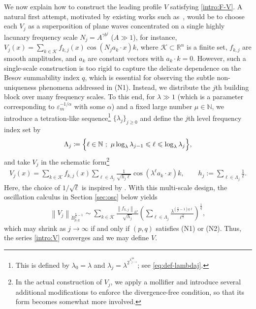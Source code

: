 \documentclass[a4paper,12pt,reqno]{amsart}
\theoremstyle{plain}
\theoremstyle{definition}
\newcommand{\dB}{\dot{B}}
\renewcommand{\leq}{\leqslant}
\renewcommand{\geq}{\geqslant}
\newcommand{\n}[1]{{\left\|#1\right\|}}
\newcommand{\N}{\mathbb{N}}
\renewcommand{\sp}[1]{\left(#1\right)}
\begin{document}
We now explain how to construct the leading profile $V$ satisfying \eqref{intro:F-V}.
A natural first attempt, motivated by existing works such as~\cite{Coi-Pal-25}, would be to choose each $V_j$
as a superposition of plane waves concentrated on a single highly lacunary frequency scale
$N_j = A^{\gamma b^j}$ ($A \gg 1$), for instance,
$V_j(x)=\sum_{k\in\mathcal{K}} f_{k,j}(x)\cos(N_j a_k\cdot x)k$,
where $\mathcal{K}\subset\mathbb{R}^n$ is a finite set, $f_{k,j}$ are smooth amplitudes, and $a_k$ are constant vectors with $a_k \cdot k = 0$.
However, such a single-scale construction is too rigid to capture the delicate dependence on the Besov summability index $q$, which is essential for observing the subtle non-uniqueness phenomena addressed in (N1).
Instead, we distribute the $j$th building block over many frequency scales.
To this end, for $\lambda\gg1$ (which is a parameter corresponding to $\varepsilon_m^{-1/\alpha}$ with some $\alpha$) and a fixed large number $\mu \in \N$, we introduce a tetration-like sequence\footnote{This is defined by $\lambda_0=\lambda$ and $\lambda_j=\lambda^{2^{\lambda_{j-1}^{4\mu}}}$; see \eqref{eq:def-lambdaj}.}
$\{\lambda_j\}_{j\geq 0}$
and define the $j$th level frequency index set by
\[
  \Lambda_j \coloneqq \Bigl\{\ell\in\mathbb{N}\ ;\ \mu\log_{\lambda}\lambda_{j-1}\leq \ell \leq \log_{\lambda}\lambda_j\Bigr\},
\]
and take $V_j$ in the schematic form\footnote{In the actual construction of $V_j$, we apply a mollifier and introduce several additional modifications to enforce the divergence-free condition, so that its form becomes somewhat more involved.}
\begin{align}
    V_j(x)
    = 
    \sum_{k\in\mathcal{K}} 
    f_{k,j}(x)
    \sum_{\ell\in\Lambda_j}\frac{1}{\sqrt{h_j\ell}}\cos \sp{\lambda^{\ell} a_k\cdot x}k,
    \qquad
    h_j
    :=
    \sum_{\ell \in \Lambda_j}\frac{1}{\ell}.
\end{align}
Here, the choice of $1/\sqrt{\ell}$ is inspired by \cites{Yon-10,Tsu-19-ARMA}.
With this multi-scale design, 
the oscillation calculus in Section \ref{sec:osc} below yields 
\begin{align}
    \n{V_j}_{\dB_{p,q}^{\frac{n}{p}-1}}
    \sim 
    \sum_{k \in \mathcal{K}}
    \frac{\n{f_{k,j}}_{L^p}}{\sqrt{h_j}}
    \sp{
    \sum_{\ell \in \Lambda_j}
    \frac{\lambda^{(\frac{n}{p}-1)q\ell}}{\ell^{\frac{q}{2}}}
    }^{\frac{1}{q}},
\end{align}
which may shrink as $j \to \infty$ if and only if $(p,q)$ satisfies (N1) or (N2).
Thus, the series \eqref{intro:V} converges and we may define $V$.
\end{document}
